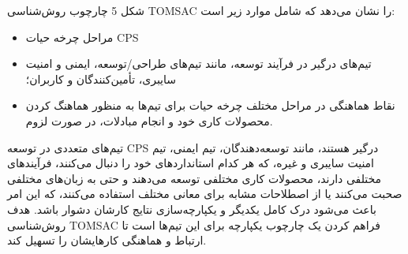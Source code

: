 \documentclass[a4paper,10pt]{article}
\begin{document}
        شکل 5 چارچوب روش‌شناسی TOMSAC را نشان می‌دهد که شامل موارد زیر است:
    
        \begin{itemize}
            
            \item مراحل چرخه حیات CPS

            \item تیم‌های درگیر در فرآیند توسعه، مانند تیم‌های طراحی/توسعه، ایمنی و امنیت   سایبری، تأمین‌کنندگان و کاربران؛

            \item نقاط هماهنگی در مراحل مختلف چرخه حیات برای تیم‌ها به منظور هماهنگ کردن محصولات کاری خود و انجام مبادلات، در صورت لزوم.

        \end{itemize}

        تیم‌های متعددی در توسعه CPS درگیر هستند، مانند توسعه‌دهندگان، تیم ایمنی، تیم امنیت سایبری و غیره، که هر کدام استانداردهای خود را دنبال می‌کنند، فرآیندهای مختلفی دارند، محصولات کاری مختلفی توسعه می‌دهند و حتی به زبان‌های مختلفی صحبت می‌کنند یا از اصطلاحات مشابه برای معانی مختلف استفاده می‌کنند، که این امر باعث می‌شود درک کامل یکدیگر و یکپارچه‌سازی نتایج کارشان دشوار باشد. هدف روش‌شناسی TOMSAC فراهم کردن یک چارچوب یکپارچه برای این تیم‌ها است تا ارتباط و هماهنگی کارهایشان را تسهیل کند.
        
\end{document}
